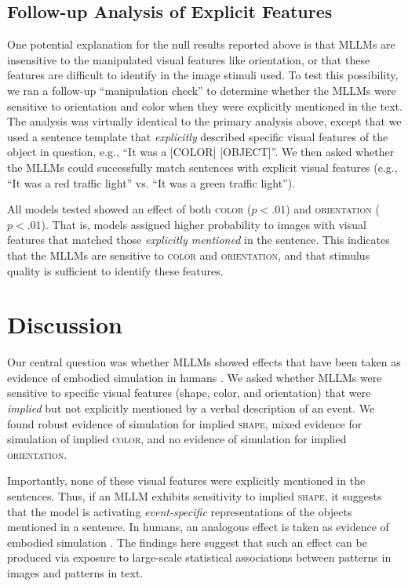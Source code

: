 \documentclass[10pt, a4paper]{article}
\begin{document}
\subsection{Follow-up Analysis of Explicit Features}\label{sec:followup}

One potential explanation for the null results reported above is that MLLMs are insensitive to the manipulated visual features like orientation, or that these features are difficult to identify in the image stimuli used.
To test this possibility, we ran a follow-up ``manipulation check'' to determine whether the MLLMs were sensitive to orientation and color when they were explicitly mentioned in the text. The analysis was virtually identical to the primary analysis above, except that we used a sentence template that \textit{explicitly} described specific visual features of the object in question, e.g., ``It was a [COLOR] [OBJECT]''. We then asked whether the MLLMs could successfully match sentences with explicit visual features (e.g., ``It was a red traffic light'' vs. ``It was a green traffic light'').

All models tested showed an effect of both \textsc{color} ($p < .01$) and \textsc{orientation} ($p < .01$). That is, models assigned higher probability to images with visual features that matched those \textit{explicitly mentioned} in the sentence. This indicates that the MLLMs are sensitive to \textsc{color} and \textsc{orientation}, and that stimulus quality is sufficient to identify these features.

\section{Discussion}

Our central question was whether MLLMs showed effects that have been taken as evidence of embodied simulation in humans \cite{stanfield2001effect}. We asked whether MLLMs were sensitive to specific visual features (shape, color, and orientation) that were \textit{implied} but not explicitly mentioned by a verbal description of an event. We found robust evidence of simulation for implied \textsc{shape}, mixed evidence for simulation of implied \textsc{color}, and no evidence of simulation for implied \textsc{orientation}.
 
Importantly, none of these visual features were explicitly mentioned in the sentences. Thus, if an MLLM exhibits sensitivity to implied \textsc{shape}, it suggests that the model is activating \textit{event-specific} representations of the objects mentioned in a sentence. In humans, an analogous effect is taken as evidence of embodied simulation \cite{stanfield2001effect, bergen2015embodiment}. The findings here suggest that such an effect can be produced via exposure to large-scale statistical associations between patterns in images and patterns in text.
\end{document}
